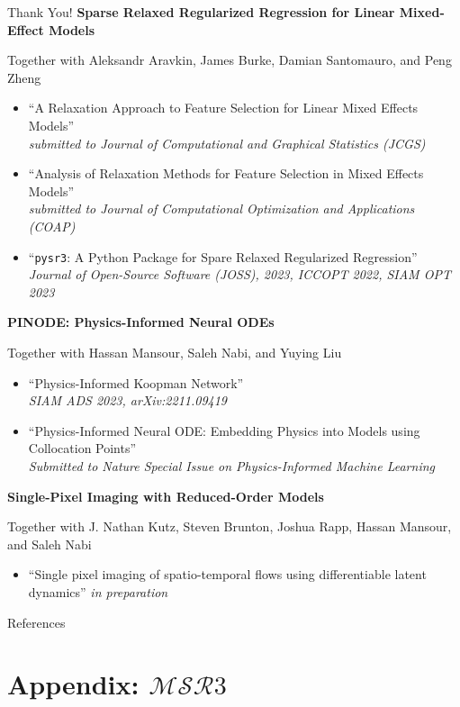 \documentclass[8pt]{beamer}
\begin{document}
\begin{frame}{Thank You!}
\vspace{1em}
\textbf{Sparse Relaxed Regularized Regression for Linear Mixed-Effect Models}\\
{\small
Together with Aleksandr Aravkin, James Burke, Damian Santomauro, and Peng Zheng
\begin{itemize}
	\item ``A Relaxation Approach to Feature Selection for Linear Mixed Effects Models''\\ \textit{submitted to Journal of Computational and Graphical Statistics (JCGS)}
	\item ``Analysis of Relaxation Methods for Feature Selection in Mixed Effects Models'' \\ \textit{submitted to Journal of Computational Optimization and Applications (COAP)}
	\item ``\texttt{pysr3}: A Python Package for Spare Relaxed Regularized Regression'' \\ \textit{Journal of Open-Source Software (JOSS), 2023, ICCOPT 2022, SIAM OPT 2023}
\end{itemize}
}

\vspace{1em}
\textbf{PINODE: Physics-Informed Neural ODEs}\\
{\small
Together with Hassan Mansour, Saleh Nabi, and Yuying Liu
\begin{itemize}
	\item ``Physics-Informed Koopman Network'' \\
	\textit{SIAM ADS 2023, arXiv:2211.09419}
	\item ``Physics-Informed Neural ODE: Embedding Physics into Models using Collocation Points''\\
	\textit{Submitted to Nature Special Issue on Physics-Informed Machine Learning}
\end{itemize}
}

\vspace{1em}
\textbf{Single-Pixel Imaging with Reduced-Order Models}\\
{\small
Together with J. Nathan Kutz, Steven Brunton, Joshua Rapp, Hassan Mansour, and Saleh Nabi
\begin{itemize}
	\item ``Single pixel imaging of spatio-temporal flows using differentiable latent dynamics'' \textit{in preparation}
\end{itemize}
}
\end{frame}

\begin{frame}{References}
    \printbibliography[heading=none]
\end{frame}

\appendix
\section{Appendix: $\mathcal{MSR}3$}
\end{document}
